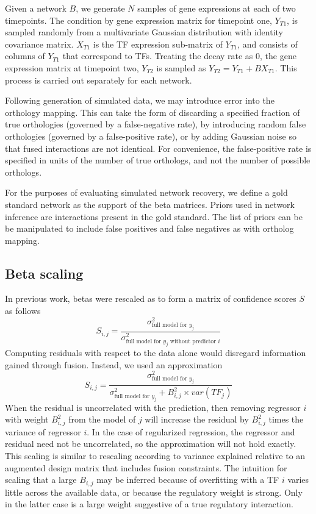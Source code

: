 \documentclass[11pt]{article}
\begin{document}
Given a network $B$, we generate $N$ samples of gene expressions at each of two timepoints. The condition by gene expression matrix for timepoint one, $Y_{T1}$, is sampled randomly from a multivariate Gaussian distribution with identity covariance matrix. $X_{T1}$ is the TF expression sub-matrix of $Y_{T1}$, and consists of columns of $Y_{T1}$ that correspond to TFs. Treating the decay rate as 0, the gene expression matrix at timepoint two, $Y_{T2}$ is sampled as $Y_{T2} = Y_{T1} + BX_{T1}$. This process is carried out separately for each network. 

Following generation of simulated data, we may introduce error into the orthology mapping. This can take the form of discarding a specified fraction of true orthologies (governed by a false-negative rate), by introducing random false orthologies (governed by a false-positive rate), or by adding Gaussian noise so that fused interactions are not identical. For convenience, the false-positive rate is specified in units of the number of true orthologs, and not the number of possible orthologs. 

For the purposes of evaluating simulated network recovery, we define a gold standard network as the support of the beta matrices. Priors used in network inference are interactions present in the gold standard. The list of priors can be be manipulated to include false positives and false negatives as with ortholog mapping. 

\subsection{Beta scaling}
In previous work, betas were rescaled as to form a matrix of confidence scores $S$ as follows
\begin{equation}
S_{i,j} = \frac{\sigma^2_{\text{full model for }y_j}}{\sigma^2_{\text{full model for }y_j \text{ without predictor }i}}
\end{equation}
Computing residuals with respect to the data alone would disregard information gained through fusion. Instead, we used an approximation
\begin{equation}
S_{i,j} = \frac{\sigma^2_{\text{full model for }y_j}}{\sigma^2_{\text{full model for }y_j} + B_{i,j}^2 \times var(TF_j)}
\end{equation}
When the residual is uncorrelated with the prediction, then removing regressor $i$ with weight $B_{i,j}^2$ from the model of $j$ will increase the residual by $B_{i,j}^2$ times the variance of regressor $i$. In the case of regularized regression, the regressor and residual need not be uncorrelated, so the approximation will not hold exactly. This scaling is similar to rescaling according to variance explained relative to an augmented design matrix that includes fusion constraints. The intuition for scaling that a large $B_{i,j}$ may be inferred because of overfitting with a TF $i$ varies little across the available data, or because the regulatory weight is strong. Only in the latter case is a large weight suggestive of a true regulatory interaction.
\end{document}
